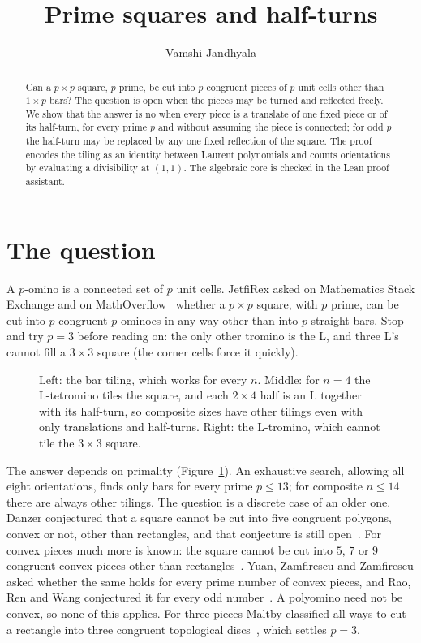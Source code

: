 \documentclass[11pt]{article}
\title{Prime squares and half-turns}
\author{Vamshi Jandhyala}
\date{}
\theoremstyle{remark}
\begin{document}
\maketitle
\vspace{-2em}

\begin{abstract}
Can a $p\times p$ square, $p$ prime, be cut into $p$ congruent pieces of $p$ unit cells other than $1\times p$
bars? The question is open when the pieces may be turned and reflected freely. We show that the answer is no
when every piece is a translate of one fixed piece or of its half-turn, for every prime $p$ and without
assuming the piece is connected; for odd $p$ the half-turn may be replaced by any one fixed reflection of the
square. The proof encodes the tiling as an identity between Laurent polynomials and counts orientations by
evaluating a divisibility at $(1,1)$. The algebraic core is checked in the Lean proof assistant.
\end{abstract}

\section{The question}

A $p$-omino is a connected set of $p$ unit cells. JetfiRex asked on Mathematics Stack Exchange and on
MathOverflow~\cite{MSE,MO} whether a $p\times p$ square, with $p$ prime, can be cut into $p$ congruent
$p$-ominoes in any way other than into $p$ straight bars. Stop and try $p=3$ before reading on: the only
other tromino is the L, and three L's cannot fill a $3\times3$ square (the corner cells force it quickly).

\begin{figure}[ht]
\centering

\caption{Left: the bar tiling, which works for every $n$. Middle: for $n=4$ the L-tetromino tiles the square,
and each $2\times4$ half is an L together with its half-turn, so composite sizes have other tilings even
with only translations and half-turns. Right: the L-tromino, which cannot tile the $3\times3$ square.}
\label{fig:tilings}
\end{figure}

The answer depends on primality (Figure~\ref{fig:tilings}). An exhaustive search, allowing all eight
orientations, finds only bars for every prime $p\le 13$; for composite $n\le14$ there are always other
tilings. The question is a discrete case of an older one. Danzer conjectured that a square cannot be cut
into five congruent polygons, convex or not, other than rectangles, and that conjecture is still
open~\cite{MRP22}. For convex pieces much more is known: the square cannot be cut into $5$, $7$ or $9$
congruent convex pieces other than rectangles~\cite{YZZ16,MRP22}. Yuan, Zamfirescu and Zamfirescu asked
whether the same holds for every prime number of convex pieces, and Rao, Ren and Wang conjectured it for every
odd number~\cite{RRW20}. A polyomino need not be convex, so none of this
applies. For three pieces Maltby classified all ways to cut a rectangle into three congruent topological
discs~\cite{Mal94}, which settles $p=3$.
\end{document}
